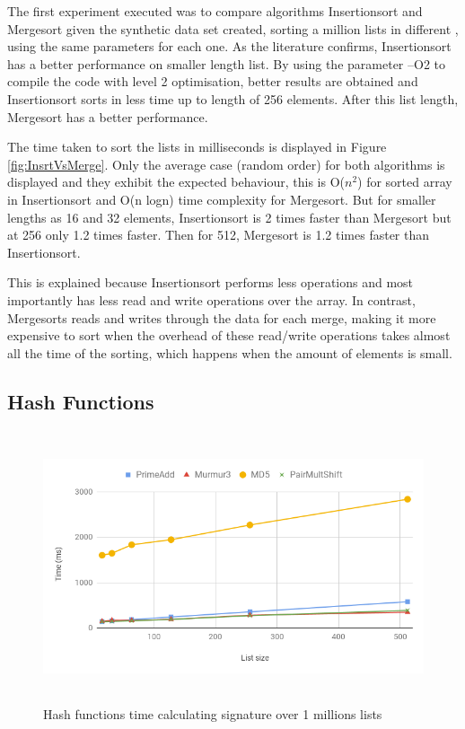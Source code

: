 \documentclass[a4paper,12pt]{article}
\begin{document}
The first experiment executed was to compare algorithms Insertionsort and Mergesort given the synthetic data set created, sorting a million lists in different , using the same parameters for each one. As the literature confirms, Insertionsort has a better performance on smaller length list. By using the parameter --O2 to compile the code with level 2 optimisation, better results are obtained and Insertionsort sorts in less time up to length of 256 elements. After this list length, Mergesort has a better performance.

The time taken to sort the lists in milliseconds is displayed in Figure \ref{fig:InsrtVsMerge}. Only the average case (random order) for both algorithms is displayed and they exhibit the expected behaviour, this is  O(${n}^2$) for sorted array in Insertionsort and O(n logn) time complexity for Mergesort.  But for smaller lengths as 16 and 32 elements, Insertionsort is 2 times faster than Mergesort but at 256 only 1.2 times faster. Then for 512, Mergesort is 1.2 times faster than Insertionsort.

This is explained because Insertionsort performs less operations and most importantly has less read and write operations over the array. In contrast, Mergesorts reads and writes through the data for each merge, making it more expensive to sort when the overhead of these read/write operations takes almost all the time of the sorting, which happens when the amount of elements is small.

\subsection{Hash Functions}

\begin{figure}[H]
    \centering
    \includegraphics[height=8cm,keepaspectratio]{./images/hashes.png}
    \caption{Hash functions time calculating signature over 1 millions lists}
    \label{fig:HashesFunc}
\end{figure}
\end{document}
